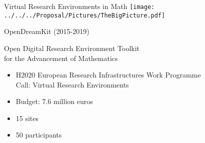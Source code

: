 \documentclass[
  usenames,svgnames, %
  compress,
  ]{beamer}
\begin{document}
\begin{frame}{Virtual Research Environments in Math}
  \texttt{[image: ../../../Proposal/Pictures/TheBigPicture.pdf]}
\end{frame}

\begin{frame}{OpenDreamKit (2015-2019)}
  \begin{block}{Open Digital Research Environment Toolkit\\
    for the Advancement of Mathematics}
    \begin{itemize}
    \item H2020 European Research Infrastructures Work
      Programme\\
      Call: Virtual Research Environments
    \item Budget: 7.6 million euros
    \item 15 sites
    \item 50 participants
    \end{itemize}
  \end{block}
\end{frame}
\end{document}
